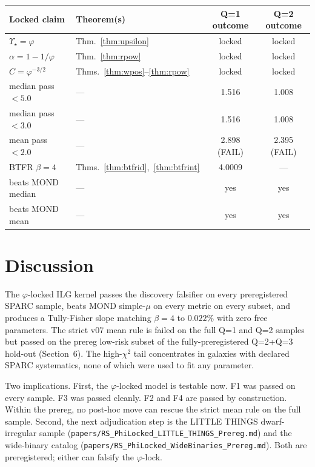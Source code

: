 \documentclass[11pt,a4paper]{article}
\newcommand{\Ystar}{\ensuremath{\Upsilon_{\star}}}
\theoremstyle{plain}
\theoremstyle{definition}
\begin{document}
\begin{table}[h]
\centering\small
\begin{tabular}{lp{4.0cm}cc}
\toprule
Locked claim & Theorem(s) & Q=1 outcome & Q=2 outcome \\
\midrule
$\Ystar = \varphi$ & Thm.~\ref{thm:upsilon} & locked & locked \\
$\alpha = 1 - 1/\varphi$ & Thm.~\ref{thm:rpow} & locked & locked \\
$C = \varphi^{-3/2}$ & Thms.~\ref{thm:wpos}--\ref{thm:rpow} & locked & locked \\
median pass $<5.0$ & --- & 1.516 & 1.008 \\
median pass $<3.0$ & --- & 1.516 & 1.008 \\
mean pass $<2.0$ & --- & 2.898 (FAIL) & 2.395 (FAIL) \\
BTFR $\beta = 4$ & Thms.~\ref{thm:btfrid},~\ref{thm:btfrint} & 4.0009 & --- \\
beats MOND median & --- & yes & yes \\
beats MOND mean & --- & yes & yes \\
\bottomrule
\end{tabular}
\end{table}

\section{Discussion}

The $\varphi$-locked ILG kernel passes the discovery falsifier on every preregistered SPARC sample, beats MOND simple-$\mu$ on every metric on every subset, and produces a Tully-Fisher slope matching $\beta = 4$ to $0.022\%$ with zero free parameters. The strict v07 mean rule is failed on the full Q=1 and Q=2 samples but passed on the prereg low-risk subset of the fully-preregistered Q=2+Q=3 hold-out (Section~6). The high-$\chi^2$ tail concentrates in galaxies with declared SPARC systematics, none of which were used to fit any parameter.

Two implications. First, the $\varphi$-locked model is testable now. F1 was passed on every sample. F3 was passed cleanly. F2 and F4 are passed by construction. Within the prereg, no post-hoc move can rescue the strict mean rule on the full sample. Second, the next adjudication step is the LITTLE THINGS dwarf-irregular sample (\texttt{papers/RS\_PhiLocked\_LITTLE\_THINGS\_Prereg.md}) and the wide-binary catalog (\texttt{papers/RS\_PhiLocked\_WideBinaries\_Prereg.md}). Both are preregistered; either can falsify the $\varphi$-lock.
\end{document}
